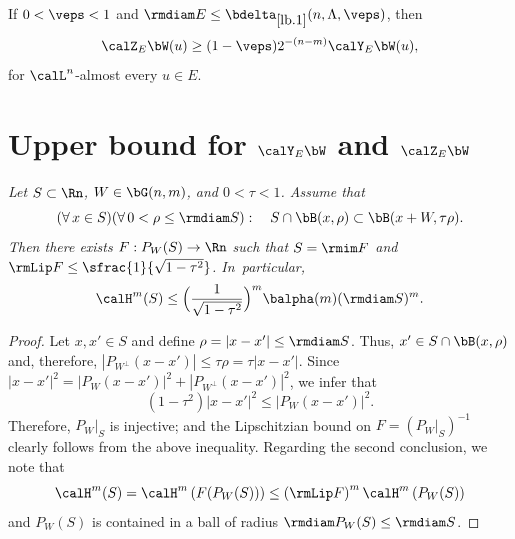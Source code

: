 \begin{corollary}
\label{lb.2}
If $0 < \veps < 1$ and $\rmdiam E \leq \bdelta_{\ref{lb.1}}(n,\Lambda,\veps)$, then
\begin{equation*}
\calZ_E \bW(u) \geq (1-\veps) 2^{-(n-m)}\calY_E \bW(u),
\end{equation*}
for $\calL^n$-almost every $u \in E$.
\end{corollary}

\section{Upper bound for \texorpdfstring{$\calY_E \bW$ and $\calZ_E \bW$}{YZ}}\label{sec:6}

\begin{Empty}
\label{bow.tie}
{\it
Let $S \subset \Rn$, $W \in \bG(n,m)$, and $0 < \tau < 1$. Assume that
\begin{equation*}
(\forall \,x \in S)(\forall \,0 < \rho \leq \rmdiam S):\quad S \cap \bB(x,\rho) \subset \bB(x+W,\tau\rho).
\end{equation*}
Then there exists $F: P_W(S) \to \Rn$ such that $S=\rmim F$ and $\rmLip F \leq \sfrac{1}{\sqrt{1-\tau^2}}$. In~particular,
\begin{equation*}
\calH^m(S) \leq \Bigl(\frac{1}{\sqrt{1-\tau^2}} \Bigr)^m \balpha(m) (\rmdiam S)^m.
\end{equation*}
}
\end{Empty}

\begin{proof}
Let $x,x' \in S$ and define $\rho = |x-x'| \leq \rmdiam S$.
Thus, $x' \in S \cap \bB(x,\rho)$ and, therefore, $\left|P_{W^\perp}(x-x') \right| \leq \tau \rho = \tau |x-x'|$.
Since $|x-x'|^2 = \left|P_{W}(x-x') \right|^2 + \left|P_{W^\perp}(x-x') \right|^2$, we infer that
\begin{equation*}
(1-\tau^2) \left|x-x'\right|^2 \leq \left|P_{W}(x-x') \right|^2.
\end{equation*}
Therefore, $P_W|_S$ is injective; and the Lipschitzian bound on $F = \left(P_W|_S \right)^{-1}$ clearly follows from the above inequality.
Regarding the second conclusion, we note that
\begin{equation*}
\calH^m(S) = \calH^m\left(F(P_W(S)) \right) \leq \left(\rmLip F\right)^m \calH^m \left(P_W(S) \right)
\end{equation*}
and $P_W(S)$ is contained in a ball of radius $\rmdiam P_W(S) \leq \rmdiam S$.
\end{proof}

